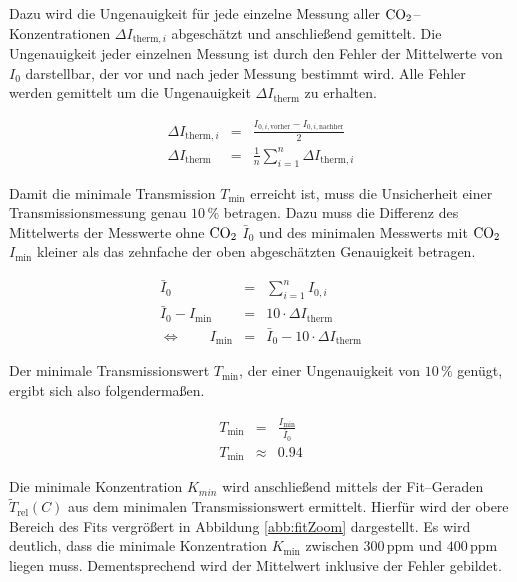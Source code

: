 \documentclass[12pt,a4paper]{scrartcl}
\numberwithin{equation}{section} %
\begin{document}
	Dazu wird die Ungenauigkeit für jede einzelne Messung aller $\ce{CO_2}$--Konzentrationen $\Delta I_{\mathrm{therm}, i}$ abgeschätzt und anschließend gemittelt. Die Ungenauigkeit jeder einzelnen Messung ist durch den Fehler der Mittelwerte von $I_0$ darstellbar, der vor und nach jeder Messung bestimmt wird. Alle Fehler werden gemittelt um die Ungenauigkeit $\Delta I_\mathrm{therm}$ zu erhalten.
	
	\begin{eqnarray}
		\Delta I_{\mathrm{therm}, i} &=& \frac{I_{0, i, \mathrm{vorher}} - I_{0, i, \mathrm{nachher}}}{2} \\
		\Delta I_\mathrm{therm} &=& \frac{1}{n} \sum_{i = 1}^{n} \Delta I_{\mathrm{therm}, i}
	\end{eqnarray}
	
	\noindent
	Damit die minimale Transmission $T_\mathrm{min}$ erreicht ist, muss die Unsicherheit einer Transmissionsmessung genau $10 \mathrm{\, \%}$ betragen. Dazu muss die Differenz des Mittelwerts der Messwerte ohne $\ce{CO_2}$ $\bar{I}_{0}$ und des minimalen Messwerts mit $\ce{CO_2}$ $I_\mathrm{min}$ kleiner als das zehnfache der oben abgeschätzten Genauigkeit betragen.
	
	\begin{eqnarray}
		\bar{I}_0 &=& \sum_{i=1}^{n} I_{0, i} \\
		\bar{I}_0 - I_\mathrm{min} &=& 10 \cdot \Delta I_\mathrm{therm} \\
		\Leftrightarrow \qquad I_\mathrm{min} &=& \bar{I}_0 - 10 \cdot \Delta I_\mathrm{therm}
	\end{eqnarray}
	
	\noindent
	Der minimale Transmissionswert $T_\mathrm{min}$, der einer Ungenauigkeit von $10 \mathrm{\, \%}$ genügt, ergibt sich also folgendermaßen.
	
	\begin{eqnarray}
		T_\mathrm{min} &=& \frac{I_\mathrm{min}}{\bar{I}_0} \\
		T_\mathrm{min} &\approx& 0.94
	\end{eqnarray}
	
	\noindent
	Die minimale Konzentration $K_{min}$ wird anschließend mittels der Fit--Geraden $\tilde{T}_\mathrm{rel}(C)$ aus dem minimalen Transmissionswert ermittelt. Hierfür wird der obere Bereich des Fits vergrößert in Abbildung \ref{abb:fitZoom} dargestellt. Es wird deutlich, dass die minimale Konzentration $K_\mathrm{min}$ zwischen $300 \mathrm{\, ppm}$ und $400 \mathrm{\, ppm}$ liegen muss. Dementsprechend wird der Mittelwert inklusive der Fehler gebildet.
	
\end{document}
